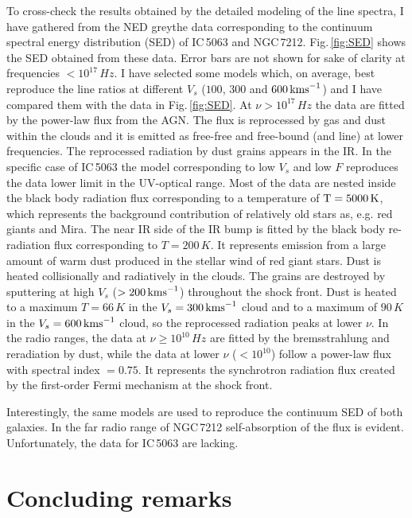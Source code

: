 \documentclass[../main.tex]{subfiles}
\begin{document}
To cross-check the results obtained by the detailed modeling of the line spectra, I have gathered from the NED greythe data corresponding to the continuum spectral energy distribution (SED) of IC\,5063 and NGC\,7212. 
Fig.\,\ref{fig:SED} shows the SED obtained from these data. 
Error bars are not shown for sake of clarity at frequencies $< 10^{17}\,\si{Hz}$.
I have selected some models which, on average, best reproduce the line ratios at different   $V_s$ ($100$, $300$ and $600 \,\si{\kms}$) and I have compared them with the data in Fig.\,\ref{fig:SED}.
At $\nu>10^{17}\,\si{Hz}$ the data are fitted by the power-law flux from the AGN.
The flux is reprocessed by gas and dust within the clouds and it is emitted as free-free and free-bound (and line) at lower frequencies. 
The reprocessed radiation by dust grains appears in the IR.
In the specific case of IC\,5063 the model corresponding to low $V_s$ and low $F$ reproduces the data lower limit in the UV-optical range.
Most of the data are nested inside the black body radiation flux corresponding to a temperature of $\rm T=5000\,\si{K}$, which represents the background contribution of relatively old stars as, e.g. red giants and Mira. 
The near IR side of the IR bump is fitted by the black body re-radiation flux corresponding to $ T=200\,\si{K}$. 
It represents emission from a large amount of warm dust produced in the stellar wind of red giant stars. 
Dust is heated collisionally and radiatively in the clouds.
The grains are destroyed by sputtering at high   $V_s$ ($> 200 \,\si{\kms}$) throughout the shock front.
Dust is heated to a maximum $T=66\,\si{K}$ in the $V_s =300 \,\si{\kms}$ cloud and to a maximum of $90\,\si{K}$ in the $V_s=600 \,\si{\kms}$ cloud, so the reprocessed radiation peaks at lower $\nu$. 
In the radio ranges, the data at $\nu\geq 10^{10}\,\si{Hz}$ are fitted by the bremsstrahlung and reradiation by dust, while the data at lower $\nu$ ($<10^{10}$) follow a power-law flux with spectral index $=0.75$. 
It represents the synchrotron radiation flux created by the first-order Fermi mechanism at the shock front.


Interestingly, the same models are used to reproduce the continuum SED of  both galaxies.
In the far radio range of NGC\,7212 self-absorption of the flux is evident. 
Unfortunately, the data for IC\,5063 are lacking.


\section{Concluding remarks}
\label{sec:conclusions}
\end{document}
